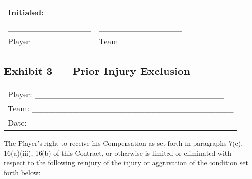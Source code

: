 \documentclass[
]{book}
\begin{document}
\begin{longtable}[]{@{}ll@{}}
\toprule()
Initialed: & \\
\midrule()
\endhead
\_\_\_\_\_\_\_\_\_\_\_\_\_\_ & \_\_\_\_\_\_\_\_\_\_\_\_\_\_ \\
Player & Team \\
\bottomrule()
\end{longtable}

\newpage

\hypertarget{exhibit-3-prior-injury-exclusion}{%
\subsection{Exhibit 3 --- Prior Injury Exclusion}\label{exhibit-3-prior-injury-exclusion}}

\begin{longtable}[]{@{}l@{}}
\toprule()
\endhead
Player: \_\_\_\_\_\_\_\_\_\_\_\_\_\_\_\_\_\_\_\_\_\_\_\_\_\_\_\_\_\_\_\_ \\
Team: \_\_\_\_\_\_\_\_\_\_\_\_\_\_\_\_\_\_\_\_\_\_\_\_\_\_\_\_\_\_\_\_\_\_ \\
Date: \_\_\_\_\_\_\_\_\_\_\_\_\_\_\_\_\_\_\_\_\_\_\_\_\_\_\_\_\_\_\_\_\_\_ \\
\bottomrule()
\end{longtable}

The Player's right to receive his Compensation as set forth in paragraphs 7(c), 16(a)(iii), 16(b) of this Contract, or otherwise is limited or eliminated with respect to the following reinjury of the injury or aggravation of the condition set forth below:
\end{document}
